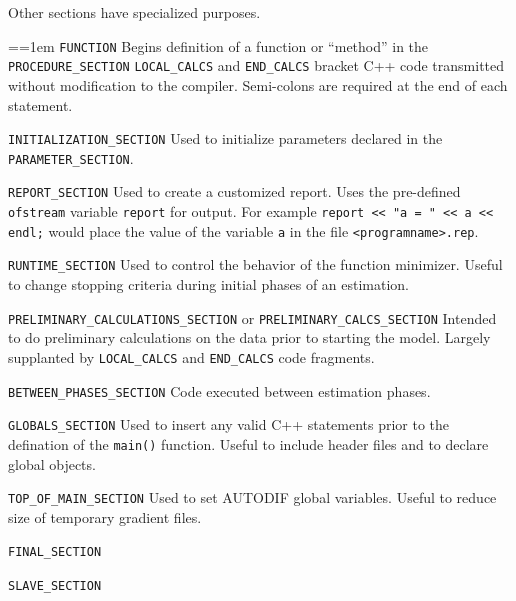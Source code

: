Other sections have specialized purposes.

\par{\everypar={\hangindent=1em }
\verb+FUNCTION+ Begins definition of a function or ``method'' in the \verb+PROCEDURE_SECTION+ 
\verb+LOCAL_CALCS+ and \verb+END_CALCS+ bracket C++ code transmitted
without modification to the compiler. 
Semi-colons are required at the end of each statement.

\verb+INITIALIZATION_SECTION+
Used to initialize parameters declared in the \verb+PARAMETER_SECTION+. 

\verb+REPORT_SECTION+
Used to create a customized report. Uses the pre-defined
\verb+ofstream+ variable \verb+report+ for output. For example
\verb+report << "a = " << a << endl;+ would place the value of the
variable \verb+a+ in the file \verb+<programname>.rep+.

\verb+RUNTIME_SECTION+
Used to control the behavior of the function minimizer. Useful to
change stopping criteria during initial phases of an estimation.

\verb+PRELIMINARY_CALCULATIONS_SECTION+ or \verb+PRELIMINARY_CALCS_SECTION+
Intended to do preliminary calculations on the data prior to starting
the model. Largely supplanted by 
\verb+LOCAL_CALCS+ and \verb+END_CALCS+ code fragments.

\verb+BETWEEN_PHASES_SECTION+
Code executed between estimation phases.

\verb+GLOBALS_SECTION+
Used to insert any valid C++ statements prior to the defination of
the \verb+main()+ function. Useful to include header files and to
declare global objects.

\verb+TOP_OF_MAIN_SECTION+
Used to set AUTODIF global variables. Useful to reduce size of
temporary gradient files.

\verb+FINAL_SECTION+

\verb+SLAVE_SECTION+

}

